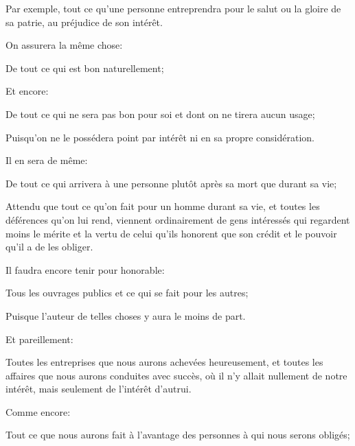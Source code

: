 Par exemple, tout ce qu'une personne entreprendra pour le salut ou la gloire de sa patrie, au préjudice de
son intérêt.

On assurera la même chose:

\begin{lieu}
	De tout ce qui est bon naturellement;
\end{lieu}

Et encore:

\begin{lieu}
	De tout ce qui ne sera pas bon pour soi et dont on ne tirera aucun usage;
\end{lieu}

Puisqu'on ne le possédera point par intérêt ni en sa propre considération.

\bigbreak

Il en sera de même:

\begin{lieu}
	De tout ce qui arrivera à une personne plutôt après sa mort que durant sa vie;
\end{lieu}

Attendu que tout ce qu'on fait pour un homme durant sa vie, et toutes les déférences qu'on lui rend, viennent
ordinairement de gens intéressés qui regardent moins le mérite et la vertu de celui qu'ils honorent que son crédit
et le pouvoir qu'il a de les obliger.

\bigbreak

Il faudra encore tenir pour honorable:

\begin{lieu}
	Tous les ouvrages publics et ce qui se fait pour les autres;
\end{lieu}

Puisque l'auteur de telles choses y aura le moins de part.

\bigbreak

Et pareillement:

\begin{lieu}
	Toutes les entreprises que nous aurons achevées heureusement, et toutes les affaires que nous aurons conduites
	avec succès, où il n'y allait nullement de notre intérêt, mais seulement de l’intérêt d'autrui.
\end{lieu}

\bigbreak

Comme encore:

\begin{lieu}
	Tout ce que nous aurons fait à l'avantage des personnes à qui nous serons obligés;
\end{lieu}

